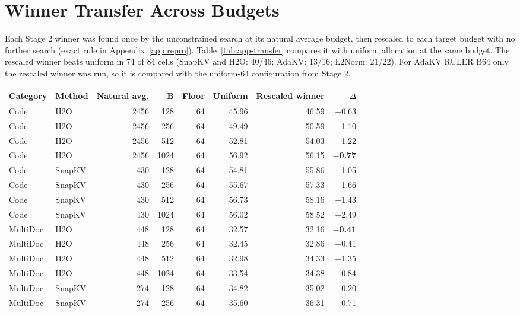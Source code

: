\section{Winner Transfer Across Budgets}
\label{app:transfer}

Each Stage 2 winner was found once by the unconstrained search at its natural average budget, then rescaled to each target budget with no further search (exact rule in Appendix~\ref{app:repro}). Table~\ref{tab:app-transfer} compares it with uniform allocation at the same budget. The rescaled winner beats uniform in 74 of 84 cells (SnapKV and H2O: 40/46; AdaKV: 13/16; L2Norm: 21/22). For AdaKV RULER B64 only the rescaled winner was run, so it is compared with the uniform-64 configuration from Stage 2.

\begin{table}[t]
  \centering
  \scriptsize
  \setlength{\tabcolsep}{3pt}
  \begin{tabular}{@{}l l r r r r r r@{}}
    \toprule
    Category & Method & Natural avg. & B & Floor & Uniform & Rescaled winner & $\Delta$ \\
    \midrule
    Code & H2O & 2456 & 128 & 64 & 45.96 & 46.59 & +0.63 \\
    Code & H2O & 2456 & 256 & 64 & 49.49 & 50.59 & +1.10 \\
    Code & H2O & 2456 & 512 & 64 & 52.81 & 54.03 & +1.22 \\
    Code & H2O & 2456 & 1024 & 64 & 56.92 & 56.15 & \textbf{$-$0.77} \\
    Code & SnapKV & 430 & 128 & 64 & 54.81 & 55.86 & +1.05 \\
    Code & SnapKV & 430 & 256 & 64 & 55.67 & 57.33 & +1.66 \\
    Code & SnapKV & 430 & 512 & 64 & 56.73 & 58.16 & +1.43 \\
    Code & SnapKV & 430 & 1024 & 64 & 56.02 & 58.52 & +2.49 \\
    MultiDoc & H2O & 448 & 128 & 64 & 32.57 & 32.16 & \textbf{$-$0.41} \\
    MultiDoc & H2O & 448 & 256 & 64 & 32.45 & 32.86 & +0.41 \\
    MultiDoc & H2O & 448 & 512 & 64 & 32.98 & 34.33 & +1.35 \\
    MultiDoc & H2O & 448 & 1024 & 64 & 33.54 & 34.38 & +0.84 \\
    MultiDoc & SnapKV & 274 & 128 & 64 & 34.82 & 35.02 & +0.20 \\
    MultiDoc & SnapKV & 274 & 256 & 64 & 35.60 & 36.31 & +0.71 \\

\end{tabular}
\end{table}
